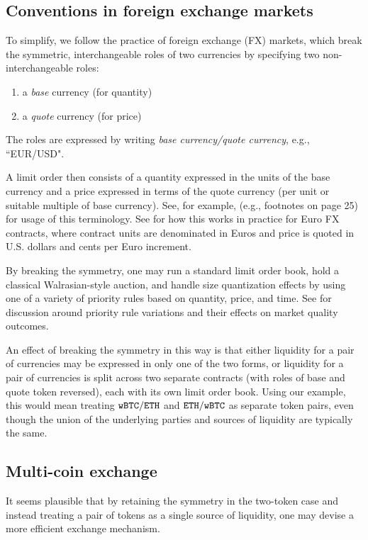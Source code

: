 \documentclass[11pt, reqno]{amsart}
\theoremstyle{definition}
\theoremstyle{remark}
\newcommand{\BTC}{\textnormal{\texttt{wBTC}}}
\newcommand{\ETH}{\textnormal{\texttt{ETH}}}
\begin{document}
\subsection{Conventions in foreign exchange markets}
To simplify, we follow the practice of foreign exchange (FX) markets,
which break the symmetric, interchangeable roles of two currencies by
specifying two non-interchangeable roles:
\begin{enumerate}
    \item a \emph{base} currency (for quantity)
    \item a \emph{quote} currency (for price)
\end{enumerate}
The roles are expressed by writing \emph{base currency/quote currency}, e.g.,
``EUR/USD".

A limit order then consists of a quantity expressed in the units of the base
currency and a price expressed in terms of the quote currency (per unit or
suitable multiple of base currency). See, for example, \cite{Cme23} (e.g.,
footnotes on page 25) for usage of this terminology. See \cite{CmeFx} for how
this works in practice for Euro FX contracts, where contract units are
denominated in Euros and price is quoted in U.S. dollars and cents per Euro
increment.

By breaking the symmetry, one may run a standard limit order book, hold a
classical Walrasian-style auction, and handle size quantization effects by
using one of a variety of priority rules based on quantity, price, and time.
See \cite{BeLaLiVa22} for discussion around priority rule variations and their
effects on market quality outcomes.

An effect of breaking the symmetry in this way is that either liquidity for a
pair of currencies may be expressed in only one of the two forms, or liquidity
for a pair of currencies is split across two separate contracts (with roles of
base and quote token reversed), each with its own limit order book.
Using our example, this would mean treating $\BTC/\ETH$ and $\ETH/\BTC$ as
separate token pairs, even though the union of the underlying parties and
sources of liquidity are typically the same.

\subsection{Multi-coin exchange}
It seems plausible that by retaining the symmetry in the two-token case and
instead treating a pair of tokens as a single source of liquidity, one may
devise a more efficient exchange mechanism.
\end{document}
